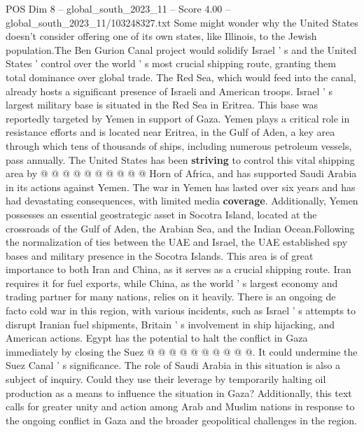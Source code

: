 \begin{textsample}{POS Dim 8 – global\_south\_2023\_11 – Score 4.00 – global\_south\_2023\_11/103248327.txt}
Some might wonder why the United States doesn't consider offering one of its own states, like Illinois, to the Jewish population.The Ben Gurion Canal project would solidify Israel ' s and the United States ' control over the world ' s most crucial shipping route, granting them total dominance over global trade.
The Red Sea, which would feed into the canal, already hosts a significant presence of Israeli and American troops.
Israel ' s largest military base is situated in the Red Sea in Eritrea.
This base was reportedly targeted by Yemen in support of Gaza.
Yemen plays a critical role in resistance efforts and is located near Eritrea, in the Gulf of Aden, a key area through which tens of thousands of ships, including numerous petroleum vessels, pass annually.
The United States has been \textbf{striving} to control this vital shipping area by @ @ @ @ @ @ @ @ @ @ Horn of Africa, and has supported Saudi Arabia in its actions against Yemen.
The war in Yemen has lasted over six years and has had devastating consequences, with limited media \textbf{coverage}.
Additionally, Yemen possesses an essential geostrategic asset in Socotra Island, located at the crossroads of the Gulf of Aden, the Arabian Sea, and the Indian Ocean.Following the normalization of ties between the UAE and Israel, the UAE established spy bases and military presence in the Socotra Islands.
This area is of great importance to both Iran and China, as it serves as a crucial shipping route.
Iran requires it for fuel exports, while China, as the world ' s largest economy and trading partner for many nations, relies on it heavily.
There is an ongoing de facto cold war in this region, with various incidents, such as Israel ' s attempts to disrupt Iranian fuel shipments, Britain ' s involvement in ship hijacking, and American actions.
Egypt has the potential to halt the conflict in Gaza immediately by closing the Suez @ @ @ @ @ @ @ @ @ @.
It could undermine the Suez Canal ' s significance.
The role of Saudi Arabia in this situation is also a subject of inquiry.
Could they use their leverage by temporarily halting oil production as a means to influence the situation in Gaza?
Additionally, this text calls for greater unity and action among Arab and Muslim nations in response to the ongoing conflict in Gaza and the broader geopolitical challenges in the region.

\end{textsample}
